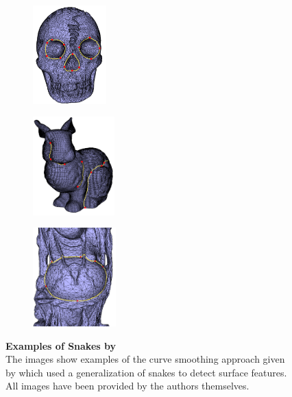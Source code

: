 \documentclass{stdlocal}
\begin{document}
\begin{figure}[t]
  \centering
  \begin{subfigure}[b]{0.32\linewidth}
    \centering
    \includegraphics[height=3.8cm]{images/lee2002-1.png}
  \end{subfigure}
  \begin{subfigure}[b]{0.32\linewidth}
    \centering
    \includegraphics[height=3.8cm]{images/lee2002-2.png}
  \end{subfigure}
  \begin{subfigure}[b]{0.32\linewidth}
    \centering
    \includegraphics[height=3.8cm]{images/lee2002-3.png}
  \end{subfigure}
  \caption[Examples of Snakes by \textcite{lee2002}]{%
    \textbf{Examples of Snakes by \textcite{lee2002}}\\
    The images show examples of the curve smoothing approach given by \textcite{lee2002} which used a generalization of snakes to detect surface features.
    All images have been provided by the authors themselves.
  }
  \label{fig:lee2002}
\end{figure}
\end{document}

